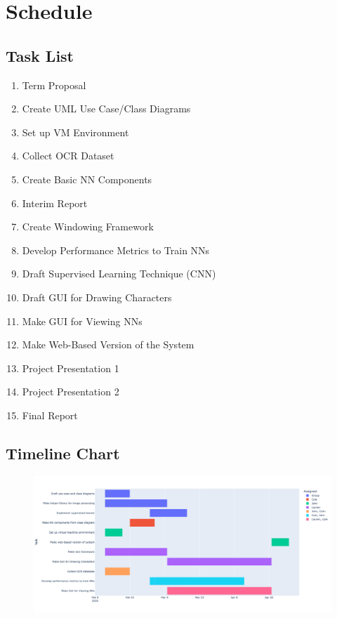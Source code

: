 \documentclass[english,12pt]{article}
\begin{document}
\section{Schedule}

\subsection{Task List}
\begin{enumerate}
    \item Term Proposal
    \item Create UML Use Case/Class Diagrams
    \item Set up VM Environment
    \item Collect OCR Dataset
    \item Create Basic NN Components
    \item Interim Report
    \item Create Windowing Framework
    \item Develop Performance Metrics to Train NNs
    \item Draft Supervised Learning Technique (CNN)
    \item Draft GUI for Drawing Characters
    \item Make GUI for Viewing NNs
    \item Make Web-Based Version of the System
    \item Project Presentation 1
    \item Project Presentation 2
    \item Final Report
\end{enumerate}
\subsection{Timeline Chart}
\begin{figure}[H]
  \includegraphics[width=15cm]{images/gantt_chart.png}
\end{figure}
\end{document}
